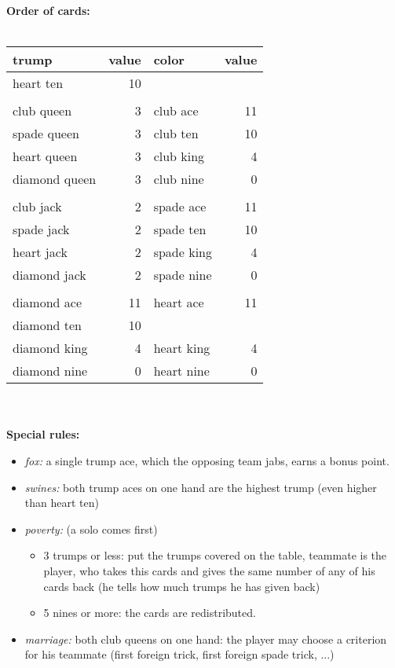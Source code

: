 \documentclass[a4paper,11pt,twocolumn]{article}
\begin{document}
\thispagestyle{empty}
\textbf{Order of cards:}\ \\
\smallskip\ \\
\begin{tabular}{lr|lr}
trump & value & color & value\\
\hline
heart ten & 10 &  &      \\
          &    &  &      \\
club queen & 3 &  club ace & 11\\
spade queen & 3   &  club ten & 10\\
heart queen & 3  &  club king & 4\\
diamond queen & 3  &club nine  & 0\\
          &    &           & \\
club jack& 2  &   spade ace & 11\\
spade jack & 2  &  spade ten & 10\\
heart jack & 2  &  spade king & 4\\
diamond jack & 2  &  spade nine   & 0\\
          &    &            & \\
diamond ace   & 11 & heart ace    & 11\\
diamond ten & 10 &            & \\
diamond king & 4 & heart king& 4\\
diamond nine   & 0 & heart nine  &0\\
\end{tabular}
\ \\
\smallskip
\ \\
\textbf{Special rules:}
\begin{itemize}
\item \textit{fox:} a single trump ace, which the opposing team jabs, earns a bonus point.
\item \textit{swines:} both trump aces on one hand are the highest trump (even higher than heart ten)
\item \textit{poverty:} (a solo comes first)
\begin{itemize}
\item 3 trumps or less: put the trumps covered on the table, teammate is the player, who takes this cards and gives
the same number of any of his cards back (he tells how much trumps he has given back)
\item 5 nines or more: the cards are redistributed.
\end{itemize}
\item \textit{marriage:} both club queens on one hand: the player may choose a criterion for his teammate
(first foreign trick, first foreign spade trick, ...)
\end{itemize}
\end{document}
